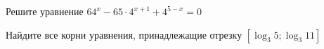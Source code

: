\begin{ex}
	\begin{condition}
		\begin{enumcols}[label=\asbuk*)]
			\item Решите уравнение \(64^x - 65\cdot 4^{x+1} +4^{5-x}  = 0  \)
			\item Найдите все корни уравнения, принадлежащие отрезку \(  \left[\log_3 5;\log_3 11\right] \)
		\end{enumcols}
	\end{condition}
\end{ex}